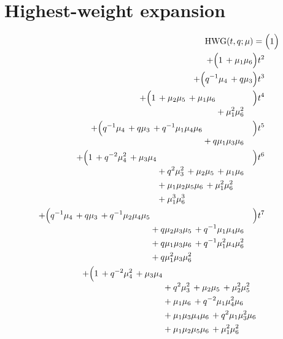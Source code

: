 \documentclass[10pt]{article}
\begin{document}
\section{Highest-weight expansion}
\[
\begin{aligned}
\mathrm{HWG}(t,q;\mu) ={}&
   \Bigl(1\Bigr) \\
  + \Bigl(1\,+\mu_{1}\mu_{6}\Bigr)t^{2} \\
  + \Bigl(q^{-1}\mu_{4}\,+q\mu_{3}\Bigr)t^{3} \\
  + \Bigl(\begin{aligned}[t]1\,+\mu_{2}\mu_{5}\,+\mu_{1}\mu_{6} \\
  &{}+\mu_{1}^{2}\mu_{6}^{2}\end{aligned}\Bigr)t^{4} \\
  + \Bigl(\begin{aligned}[t]q^{-1}\mu_{4}\,+q\mu_{3}\,+q^{-1}\mu_{1}\mu_{4}\mu_{6} \\
  &{}+q\mu_{1}\mu_{3}\mu_{6}\end{aligned}\Bigr)t^{5} \\
  + \Bigl(\begin{aligned}[t]1\,+q^{-2}\mu_{4}^{2}\,+\mu_{3}\mu_{4} \\
  &{}+q^{2}\mu_{3}^{2}\,+\mu_{2}\mu_{5}\,+\mu_{1}\mu_{6} \\
  &{}+\mu_{1}\mu_{2}\mu_{5}\mu_{6}\,+\mu_{1}^{2}\mu_{6}^{2} \\
  &{}+\mu_{1}^{3}\mu_{6}^{3}\end{aligned}\Bigr)t^{6} \\
  + \Bigl(\begin{aligned}[t]q^{-1}\mu_{4}\,+q\mu_{3}\,+q^{-1}\mu_{2}\mu_{4}\mu_{5} \\
  &{}+q\mu_{2}\mu_{3}\mu_{5}\,+q^{-1}\mu_{1}\mu_{4}\mu_{6} \\
  &{}+q\mu_{1}\mu_{3}\mu_{6}\,+q^{-1}\mu_{1}^{2}\mu_{4}\mu_{6}^{2} \\
  &{}+q\mu_{1}^{2}\mu_{3}\mu_{6}^{2}\end{aligned}\Bigr)t^{7} \\
  + \Bigl(\begin{aligned}[t]1\,+q^{-2}\mu_{4}^{2}\,+\mu_{3}\mu_{4} \\
  &{}+q^{2}\mu_{3}^{2}\,+\mu_{2}\mu_{5}\,+\mu_{2}^{2}\mu_{5}^{2} \\
  &{}+\mu_{1}\mu_{6}\,+q^{-2}\mu_{1}\mu_{4}^{2}\mu_{6} \\
  &{}+\mu_{1}\mu_{3}\mu_{4}\mu_{6}\,+q^{2}\mu_{1}\mu_{3}^{2}\mu_{6} \\
  &{}+\mu_{1}\mu_{2}\mu_{5}\mu_{6}\,+\mu_{1}^{2}\mu_{6}^{2} \\

\end{aligned}
\end{aligned}\]
\end{document}
